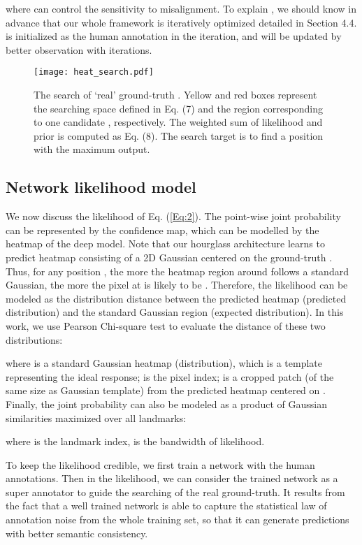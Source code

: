 \documentclass[10pt,twocolumn,letterpaper]{article}
\begin{document}
{where   can control the sensitivity to misalignment. To explain , we should know in advance that  
	our whole framework is iteratively optimized detailed in Section 4.4.  is initialized as the human annotation in the iteration, and will be updated by better observation with iterations.


	
	
	\begin{figure}[t]
		\begin{center}
\texttt{[image: heat\_search.pdf]}
		\end{center}
		\caption{{The search of  `real' ground-truth . Yellow and red boxes represent the searching space  defined in Eq. (7) and the region corresponding to one candidate , respectively. The weighted sum of likelihood and prior is computed as Eq. (8). 
				The search target is to find a position  with the maximum output.}}
		\label{fig:heat_search}
	\end{figure}
	
	
	\subsection{Network likelihood model}
	{We now discuss the likelihood  of Eq. (\ref{Eq:2}). 
		The point-wise joint probability can be represented by the confidence map, which can be modelled by the heatmap of the deep model. 
		Note that our hourglass architecture learns to predict heatmap consisting of a 2D Gaussian centered on the ground-truth 
		. Thus, for any position , the more the heatmap  
		{region around}
		 follows a standard Gaussian, 
		the more the pixel at  is likely to be . 
		Therefore, the likelihood  can be modeled as the distribution distance between the predicted heatmap (predicted distribution) and the standard Gaussian region (expected distribution).
{In this work, we use {Pearson Chi-square test to evaluate the distance of these two distributions:} }}


	
	where  is a  standard Gaussian heatmap (distribution), which is a template representing the ideal response; 
	 is the pixel index;  is a cropped patch (of the same size as Gaussian template) from the {predicted heatmap} centered 
	on .
	Finally, the joint probability can also be modeled as a product of 
	Gaussian similarities maximized over all landmarks:
	
	
	where  is the landmark index,  is the bandwidth of likelihood. 
	
	{ To keep the likelihood credible, {we first train a network with the human annotations.}
		Then in the likelihood, we can consider the trained network as a super annotator to guide the searching of the real ground-truth. 
		It results from the fact that 
a well trained network is able to capture the statistical law of annotation noise from the whole training set, so that it can generate predictions with better semantic consistency.}
	
}
\end{document}

